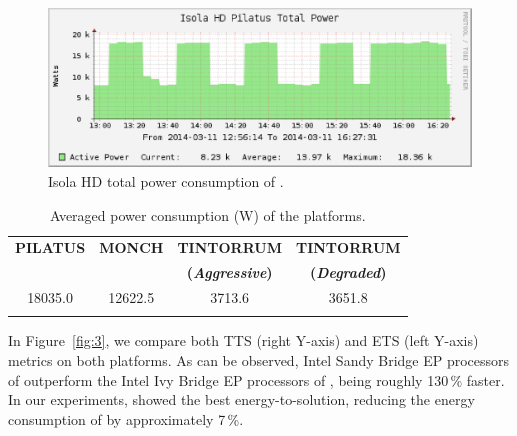 \begin{figure}[ht]
  \centering
  \includegraphics[width=1\columnwidth]{Figs/NRJ_benchmark_Pilatus.eps}
  \caption{Isola HD total power consumption of \pilat.}
  \label{fig:2}
\end{figure}

\begin{table}[ht]
  \centering
  \caption{Averaged power consumption (W) of the platforms.}
  \label{tab:1}
  \begin{tabular}{cccc}
    \hline\noalign{\smallskip}     \textbf{\scriptsize{PILATUS}}     &
    \textbf{\scriptsize{MONCH}}  &  \textbf{\scriptsize{TINTORRUM}}  &
    \textbf{\scriptsize{TINTORRUM}}           \\          &          &
    \textbf{\scriptsize{(\emph{Aggressive})}} & \textbf{\scriptsize{(\emph{Degraded})}}
    \\    \noalign{\smallskip}\hline\noalign{\smallskip}   18035.0   &
    12622.5 & 3713.6 & 3651.8 \\ \noalign{\smallskip}\hline
  \end{tabular}
\end{table}

In  Figure~\ref{fig:3}, we  compare both  TTS (right  Y-axis)  and ETS
(left  Y-axis)  metrics  on  both  platforms.  As can be observed, Intel Sandy Bridge EP processors of \pilat
outperform the Intel Ivy  Bridge EP processors of \monch, being roughly 130\,\%  faster. 
In  our experiments,  \monch  showed  the  best  energy-to-solution,
reducing the energy consumption of \pilat by approximately 7\,\%.

